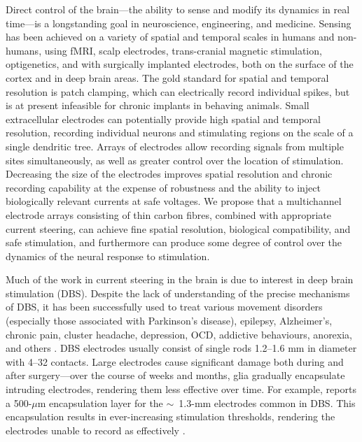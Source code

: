 \documentclass[10pt,letterpaper]{article}
\begin{document}
Direct control of the brain---the ability to sense and modify its
dynamics in real time---is a longstanding goal in neuroscience,
engineering, and medicine. Sensing has been achieved on a variety of
spatial and temporal scales in humans and non-humans, using fMRI,
scalp electrodes, trans-cranial magnetic stimulation, optigenetics,
and with surgically implanted electrodes, both on the surface of the
cortex and in deep brain areas. The gold standard for spatial and
temporal resolution is patch clamping, which can electrically record
individual spikes, but is at present infeasible for chronic implants
in behaving animals. Small extracellular electrodes can potentially
provide high spatial and temporal resolution, recording individual
neurons and stimulating regions on the scale of a single dendritic
tree. Arrays of electrodes allow recording signals from multiple sites
simultaneously, as well as greater control over the location of
stimulation. Decreasing the size of the electrodes improves spatial
resolution and chronic recording capability at the expense of
robustness and the ability to inject biologically relevant currents at
safe voltages. We propose that a multichannel electrode arrays
consisting of thin carbon fibres, combined with appropriate current
steering, can achieve fine spatial resolution, biological
compatibility, and safe stimulation, and furthermore can produce some
degree of control over the dynamics of the neural response to
stimulation.

Much of the work in current steering in the brain is due to interest
in deep brain stimulation (DBS).  Despite the lack of understanding of
the precise mechanisms of DBS, it has been successfully used to treat
various movement disorders (especially those associated with
Parkinson's disease), epilepsy, Alzheimer's, chronic pain, cluster
headache, depression, OCD, addictive behaviours, anorexia, and others
\cite{Udupa2015dbs}. DBS electrodes usually consist of single rods
1.2--1.6 mm in diameter with 4--32 contacts. Large electrodes cause
significant damage both during and after surgery---over the course of
weeks and months, glia gradually encapsulate intruding electrodes,
rendering them less effective over time. For example,
\cite{Butson2008steering} reports a 500-$\mu$m encapsulation layer for
the $\sim$~1.3-mm electrodes common in DBS.  This encapsulation
results in ever-increasing stimulation thresholds, rendering the
electrodes unable to record as effectively
\cite{Barrese2016electrodestability, Biran2005gliosis, Polikov2005gliosis, Winslow2010gliosis}.
\end{document}
